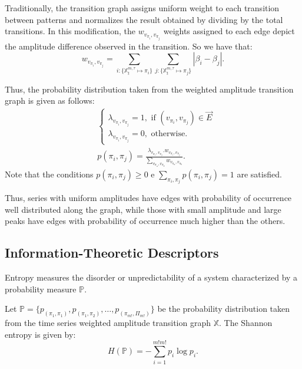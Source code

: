 \documentclass{isprs}
\begin{document}
	Traditionally, the transition graph assigns uniform weight to each transition between patterns and normalizes the result obtained by dividing by the total transitions.
	In this modification, the $w_{v_{\pi_i}, v_{\pi_j}}$ weights assigned to each edge depict the amplitude difference observed in the transition.
	So we have that:	
	\begin{equation}
	w_{v_{\pi_i}, v_{\pi_j}} =  \sum_{i : \{\mathbb{X}^{m,\tau}_t \mapsto \pi_i\}} \sum_{j : \{\mathbb{X}^{m,\tau}_t \mapsto \pi_j\}} |\beta_i - \beta_j| .
	\end{equation}
	
	Thus, the probability distribution taken from the weighted amplitude transition graph is given as follows:	
	\begin{align}
	&\left\{\begin{array}{l}
	\lambda_{v_{\pi_i}, v_{\pi_j}} = 1, \text{ if } (v_{\pi_i}, v_{\pi_j}) \in \vec{E} \\
	\lambda_{v_{\pi_i}, v_{\pi_j}} = 0, \text{ otherwise}.
	\end{array}\right. \\
	&p(\pi_i, \pi_j) = \frac{\lambda_{v_{\pi_i}, v_{\pi_j}} . w_{v_{\pi_i}, v_{\pi_j}}}{\sum_{v_{\pi_a}, v_{\pi_b}} w_{v_{\pi_a}, v_{\pi_b}}}.
	\end{align}
	Note that the conditions $p(\pi_i, \pi_j) \ge 0$ e $\sum_{\pi_i, \pi_j} p(\pi_i, \pi_j) = 1$ are satisfied.
	
	Thus, series with uniform amplitudes have edges with probability of occurrence well distributed along the graph, while those with small amplitude and large peaks have edges with probability of occurrence much higher than the others.
	
	\subsection{Information-Theoretic Descriptors}\label{HC}
	
	Entropy measures the disorder or unpredictability of a system characterized by a probability measure $\mathbb{P}$.
	
	Let $\mathbb{P} = \{p_{(\pi_1, \pi_1)}, p_{(\pi_1, \pi_2)}, \dots, p_{(\pi_{m!}, \Pi_{m!})} \}$ be the probability distribution taken from the time series weighted amplitude transition graph $\mathbb{X}$.
	The Shannon entropy is given by:	
	\begin{equation}
	H(\mathbb{P}) = -\sum_{i=1}^{m!m!} p_i \log p_i .
	\label{eq:Entropia}
	\end{equation}
	
\end{document}
